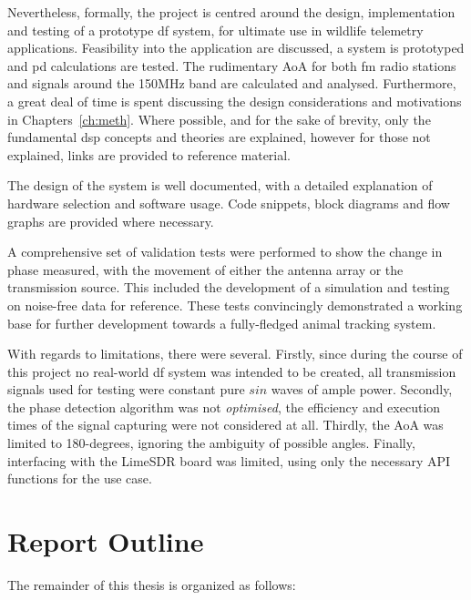 \documentclass[class=report,11pt,crop=false]{standalone}
\begin{document}
Nevertheless, formally, the project is centred around the design, implementation and testing of a prototype \gls{df} system, for ultimate use in wildlife telemetry applications. Feasibility into the application are discussed, a system is prototyped and \gls{pd} calculations are tested. The rudimentary \gls{AoA} for both \gls{fm} radio stations and signals around the 150MHz band are calculated and analysed. Furthermore, a great deal of time is spent discussing the design considerations and motivations in Chapters~\ref{ch:meth}. Where possible, and for the sake of brevity, only the fundamental \gls{dsp} concepts and theories are explained, however for those not explained, links are provided to reference material. 

The design of the system is well documented, with a detailed explanation of hardware selection and software usage. Code snippets, block diagrams and flow graphs are provided where necessary. 

A comprehensive set of validation tests were performed to show the change in phase measured, with the movement of either the antenna array or the transmission source. This included the development of a simulation and testing on noise-free data for reference. These tests convincingly demonstrated a working base for further development towards a fully-fledged animal tracking system.

With regards to limitations, there were several. Firstly, since during the course of this project no real-world \gls{df} system was intended to be created, all transmission signals used for testing were constant pure $sin$ waves of ample power. Secondly, the phase detection algorithm was not \emph{optimised}, the efficiency and execution times of the signal capturing were not considered at all. Thirdly, the \gls{AoA} was limited to 180-degrees, ignoring the ambiguity of possible angles. Finally, interfacing with the LimeSDR board was limited, using only the necessary API functions for the use case. 


\section{Report Outline}
The remainder of this thesis is organized as follows:
\end{document}
